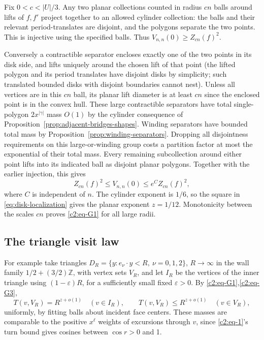 Fix \(0<c<|U|/3\). Any two planar collections counted in radius \(cn\) balls around lifts of \(f,f'\) project together to an allowed cylinder collection: the balls and their relevant period-translates are disjoint, and the polygons separate the two points. This is injective using the specified balls. Thus \(V_{n,n}(0)\ge Z_{cn}(f)^2\). 

Conversely a contractible separator encloses exactly one of the two points in its disk side, and lifts uniquely around the chosen lift of that point (the lifted polygon and its period translates have disjoint disks by simplicity; such translated bounded disks with disjoint boundaries cannot nest). Unless all vertices are in this \(cn\) ball, its planar lift diameter is at least \(cn\) since the enclosed point is in the convex hull. These large contractible separators have total single-polygon \(2x^{|\gamma|}\) mass \(O(1)\) by the cylinder consequence of Proposition~\ref{prop:adjacent-bridges-shapes}. Winding separators have bounded total mass by Proposition~\ref{prop:winding-separators}. Dropping all disjointness requirements on this large-or-winding group costs a partition factor at most the exponential of their total mass. Every remaining subcollection around either point lifts into its indicated ball as disjoint planar polygons. Together with the earlier injection, this gives
\begin{equation}
 Z_{cn}(f)^2\le V_{n,n}(0)\le e^C Z_{cn}(f)^2,
 \label{eq:disk-localization}
\end{equation}
where \(C\) is independent of \(n\). The cylinder exponent is \(1/6\),
so the square in \eqref{eq:disk-localization} gives the planar exponent
\(z=1/12\). Monotonicity between the scales \(cn\) proves
\eqref{c2:eq-G1} for all large radii.



\subsection{The triangle visit law}
For example take triangles \(D_R=\{y:e_\nu\cdot y<R,\ \nu=0,1,2\}\), \(R\to\infty\) in the wall family \(1/2+(3/2)\mathbb Z\), with vertex sets \(V_R\), and let \(I_R\) be the vertices of the inner triangle using \((1-\varepsilon)R\), for a sufficiently small fixed \(\varepsilon>0\). By \eqref{c2:eq-G1},\eqref{c2:eq-G3},
\[
 T(v,V_R)=R^{z+o(1)}\quad(v\in I_R),\qquad
 T(v,V_R)\le R^{z+o(1)}\quad(v\in V_R),
\]
uniformly, by fitting balls about incident face centers. These masses are comparable to the positive \(x^\ell\) weights of excursions through \(v\), since \eqref{c2:eq-1}'s turn bound gives cosines between \(\cos r>0\) and 1.

